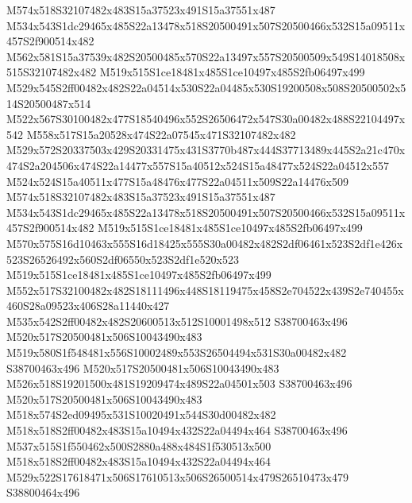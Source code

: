 \documentclass{article}
\begin{document}
\begin{multicols}{2}
M574x518S32107482x483S15a37523x491S15a37551x487 M534x543S1dc29465x485S22a13478x518S20500491x507S20500466x532S15a09511x457S2f900514x482 M562x581S15a37539x482S20500485x570S22a13497x557S20500509x549S14018508x515S32107482x482 M519x515S1ce18481x485S1ce10497x485S2fb06497x499 M529x545S2ff00482x482S22a04514x530S22a04485x530S19200508x508S20500502x514S20500487x514 M522x567S30100482x477S18540496x552S26506472x547S30a00482x488S22104497x542 M558x517S15a20528x474S22a07545x471S32107482x482 M529x572S20337503x429S20331475x431S3770b487x444S37713489x445S2a21c470x474S2a204506x474S22a14477x557S15a40512x524S15a48477x524S22a04512x557 M524x524S15a40511x477S15a48476x477S22a04511x509S22a14476x509 M574x518S32107482x483S15a37523x491S15a37551x487 M534x543S1dc29465x485S22a13478x518S20500491x507S20500466x532S15a09511x457S2f900514x482 M519x515S1ce18481x485S1ce10497x485S2fb06497x499 M570x575S16d10463x555S16d18425x555S30a00482x482S2df06461x523S2df1e426x523S26526492x560S2df06550x523S2df1e520x523 M519x515S1ce18481x485S1ce10497x485S2fb06497x499 M552x517S32100482x482S18111496x448S18119475x458S2e704522x439S2e740455x460S28a09523x406S28a11440x427 M535x542S2ff00482x482S20600513x512S10001498x512 S38700463x496 M520x517S20500481x506S10043490x483 M519x580S1f548481x556S10002489x553S26504494x531S30a00482x482 S38700463x496 M520x517S20500481x506S10043490x483 M526x518S19201500x481S19209474x489S22a04501x503 S38700463x496 M520x517S20500481x506S10043490x483 M518x574S2ed09495x531S10020491x544S30d00482x482 M518x518S2ff00482x483S15a10494x432S22a04494x464 S38700463x496 M537x515S1f550462x500S2880a488x484S1f530513x500 M518x518S2ff00482x483S15a10494x432S22a04494x464 M529x522S17618471x506S17610513x506S26500514x479S26510473x479 S38800464x496





\end{multicols}
\end{document}
